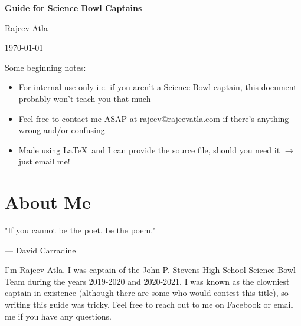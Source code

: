 \documentclass[11pt, letterpaper]{article}
\begin{document}
\setlength{\parindent}{0.5in}

\titleformat{\section}{\normalfont\Large\bfseries}{\color{red}\S \thesection}{0.5em}{}
\titleformat{\subsection}{\normalfont\Large\bfseries}{\color{olive}\S \thesubsection}{0.5em}{}
\titleformat{\subsubsection}{\normalfont\Large\bfseries}{\color{blue}\S \thesubsubsection}{0.5em}{}


\begin{center}
    \Large \textbf{Guide for Science Bowl Captains}
\end{center}
\begin{center}
    \Large Rajeev Atla
\end{center}
\begin{center}
    \Large \today
\end{center}

\noindent Some beginning notes:
\begin{itemize}
    \item For internal use only i.e. if you aren't a Science Bowl captain, this document probably won't teach you that much
    \item Feel free to contact me ASAP at rajeev@rajeevatla.com if there's anything wrong and/or confusing
    \item Made using \LaTeX\ and I can provide the source file, should you need it $\to$ just email me!
\end{itemize}

\newpage

\tableofcontents

\newpage

\section{About Me}



\epigraph{"If you cannot be the poet, be the poem."}{--- \textup{David Carradine}}


I'm Rajeev Atla.
I was captain of the John P. Stevens High School Science Bowl Team during the years 2019-2020 and 2020-2021.
I was known as the clowniest captain in existence (although there are some who would contest this title), so writing this guide was tricky.
Feel free to reach out to me on Facebook or email me if you have any questions.
\end{document}
